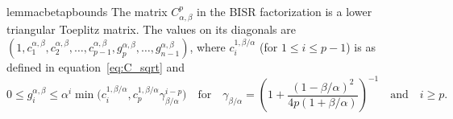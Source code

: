 \documentclass{article} %
\newcommand{\acronym}{BISR\xspace}
\begin{document}
\begin{restatable}{lemma}{cbetapbounds}
\label{lem:c_beta_p_bounds}
The matrix $C^{p}_{\alpha, \beta}$ in the \acronym factorization is a lower triangular Toeplitz matrix. 
The values on its diagonals are 
$(1, c_1^{\alpha, \beta}, c_2^{\alpha, \beta}, \dots, c_{p - 1}^{\alpha, \beta}, g_{p}^{\alpha, \beta}, \dots, g_{n - 1}^{\alpha, \beta})$, where $c_{i}^{1,\beta/\alpha}$ (for $1\leq i \leq p-1$) is as defined in equation~\eqref{eq:C_sqrt} and 
    \begin{equation}
      0\leq g_{i}^{\alpha, \beta} \leq \alpha^i\min\big( c_{i}^{1, \beta/\alpha}, c_p^{1, \beta/\alpha} \gamma_{\beta/\alpha}^{i -p}\big) \quad \text{for} \quad \gamma_{\beta/\alpha} = \left(1 + \frac{(1 - \beta/\alpha)^2}{4p(1 + \beta/\alpha)}\right)^{-1} \quad \text{and} \quad i \geq p.
    \end{equation}
\end{restatable}
\end{document}
